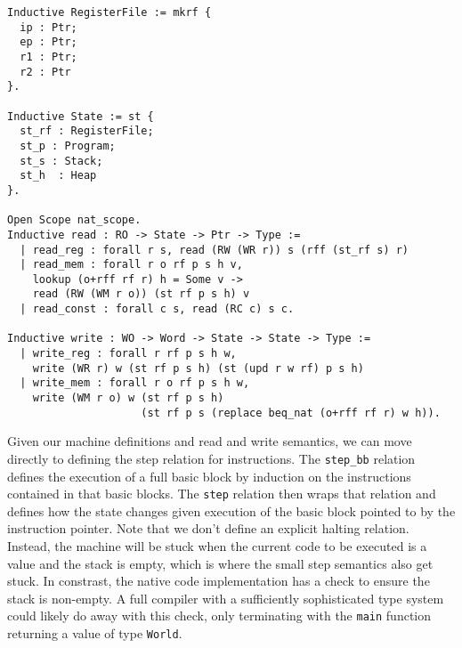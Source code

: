 \begin{verbatim}
Inductive RegisterFile := mkrf {
  ip : Ptr;
  ep : Ptr;
  r1 : Ptr; 
  r2 : Ptr
}. 

Inductive State := st {
  st_rf : RegisterFile;
  st_p : Program;
  st_s : Stack;
  st_h  : Heap
}.

Open Scope nat_scope. 
Inductive read : RO -> State -> Ptr -> Type :=
  | read_reg : forall r s, read (RW (WR r)) s (rff (st_rf s) r)
  | read_mem : forall r o rf p s h v, 
    lookup (o+rff rf r) h = Some v ->
    read (RW (WM r o)) (st rf p s h) v
  | read_const : forall c s, read (RC c) s c.

Inductive write : WO -> Word -> State -> State -> Type :=
  | write_reg : forall r rf p s h w, 
    write (WR r) w (st rf p s h) (st (upd r w rf) p s h)
  | write_mem : forall r o rf p s h w, 
    write (WM r o) w (st rf p s h) 
                     (st rf p s (replace beq_nat (o+rff rf r) w h)).
\end{verbatim}

Given our machine definitions and read and write semantics, we can move directly
to defining the step relation for instructions. The \texttt{step\_bb} relation
defines the execution of a full basic block by induction on the instructions
contained in that basic blocks. The \texttt{step} relation then wraps that
relation and defines how the state changes given execution of the basic block
pointed to by the instruction pointer. Note that we don't define an explicit
halting relation. Instead, the machine will be stuck when the current code to be
executed is a value and the stack is empty, which is where the small step
\ce semantics also get stuck. In constrast, the native code implementation has a
check to ensure the stack is non-empty. A full compiler with a sufficiently
sophisticated type system could likely do away with this check, only terminating
with the \texttt{main} function returning a value of type \texttt{World}. 

